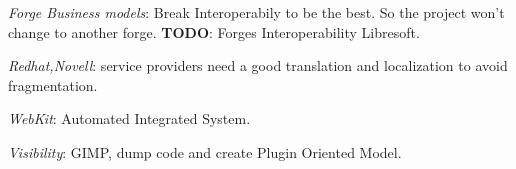 \documentclass[11pt]{scrartcl}
\begin{document}
\emph{Forge Business models}: Break Interoperabily to be the best. So the project won't change to another forge. \textbf{TODO}: Forges Interoperability Libresoft.

\emph{Redhat,Novell}: service providers need a good translation and localization to avoid fragmentation.

\emph{WebKit}: Automated Integrated System.

\emph{Visibility}: GIMP, dump code and create Plugin Oriented Model.

\begin{thebibliography}{9}

    
\end{thebibliography}
\end{document}
